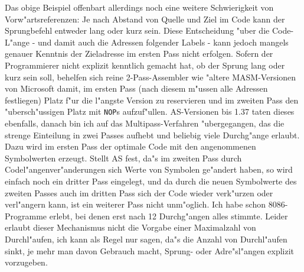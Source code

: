 \documentclass[12pt,a4paper,twoside]{report}
\newcommand{\tty}[1]{{\tt #1}}
\newcommand{\asname}{AS}
\begin{document}
Das obige Beispiel offenbart allerdings noch eine weitere Schwierigkeit
von Vorw"artsreferenzen: Je nach Abstand von Quelle und Ziel im Code kann
der Sprungbefehl entweder lang oder kurz sein.  Diese Entscheidung "uber
die Code-L"ange - und damit auch die Adressen folgender Labels - kann
jedoch mangels genauer Kenntnis der Zieladresse im ersten Pass nicht
erfolgen.  Sofern der Programmierer nicht explizit kenntlich gemacht hat,
ob der Sprung lang oder kurz sein soll, behelfen sich reine 2-Pass-Assembler
wie "altere MASM-Versionen von Microsoft damit, im ersten Pass (nach diesem
m"ussen alle Adressen festliegen) Platz f"ur die l"angste Version zu
reservieren und im zweiten Pass den "ubersch"ussigen Platz mit \tty{NOP}s
aufzuf"ullen.  \asname{}-Versionen bis 1.37 taten dieses ebenfalls, danach bin
ich auf das Multipass-Verfahren "ubergegangen, das die strenge Einteilung
in zwei Passes aufhebt und beliebig viele Durchg"ange erlaubt.  Dazu wird
im ersten Pass der optimale Code mit den angenommenen Symbolwerten erzeugt.
Stellt \asname{} fest, da"s im zweiten Pass durch Codel"angenver"anderungen sich
Werte von Symbolen ge"andert haben, so wird einfach noch ein dritter Pass
eingelegt, und da durch die neuen Symbolwerte des zweiten Passes auch
im dritten Pass sich der Code wieder verk"urzen oder verl"angern kann,
ist ein weiterer Pass nicht unm"oglich.  Ich habe schon 8086-Programme
erlebt, bei denen erst nach 12 Durchg"angen alles stimmte.  Leider
erlaubt dieser Mechanismus nicht die Vorgabe einer Maximalzahl von
Durchl"aufen, ich kann als Regel nur sagen, da"s die Anzahl von Durchl"aufen
sinkt, je mehr man davon Gebrauch macht, Sprung- oder Adre"sl"angen explizit
vorzugeben.
\end{document}
